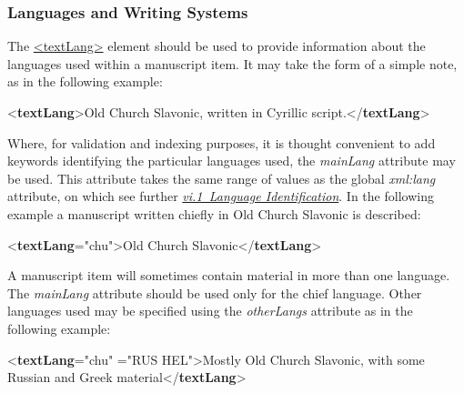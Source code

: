 \subsubsection[{Languages and Writing Systems}]{Languages and Writing Systems}\label{mslangs}\par
The \hyperref[TEI.textLang]{<textLang>} element should be used to provide information about the languages used within a manuscript item. It may take the form of a simple note, as in the following example: \par\bgroup{}\exampleFont \begin{shaded}\noindent\mbox{}{<\textbf{textLang}>}Old Church Slavonic, written in Cyrillic script.{</\textbf{textLang}>}\end{shaded}\egroup\par \par
Where, for validation and indexing purposes, it is thought convenient to add keywords identifying the particular languages used, the {\itshape mainLang} attribute may be used. This attribute takes the same range of values as the global {\itshape xml:lang} attribute, on which see further \textit{\hyperref[CHSH]{vi.1\ Language Identification}}. In the following example a manuscript written chiefly in Old Church Slavonic is described: \par\bgroup{}\exampleFont \begin{shaded}\noindent\mbox{}{<\textbf{textLang}\hspace*{1em}{mainLang}="{chu}">}Old Church Slavonic{</\textbf{textLang}>}\end{shaded}\egroup\par \par
A manuscript item will sometimes contain material in more than one language. The {\itshape mainLang} attribute should be used only for the chief language. Other languages used may be specified using the {\itshape otherLangs} attribute as in the following example: \par\bgroup{}\exampleFont \begin{shaded}\noindent\mbox{}{<\textbf{textLang}\hspace*{1em}{mainLang}="{chu}"\mbox{}\newline 
\hspace*{1em}{otherLangs}="{RUS HEL}">}Mostly Old Church Slavonic, with\mbox{}\newline 
 some Russian and Greek material{</\textbf{textLang}>}\end{shaded}\egroup\par \par
